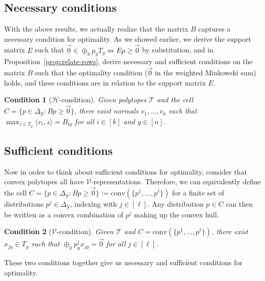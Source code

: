 \documentclass[12pt]{article}
\newcommand{\Comments}{1}
\newcommand{\mytodo}[2]{\ifnum\Comments=1%
  \todo[linecolor=#1!80!black,backgroundcolor=#1,bordercolor=#1!80!black]{#2}\fi}
\newcommand{\jessiet}[1]{\mytodo{purple!20!white}{JF: #1}}
\newcommand{\simplex}{\Delta_\Y}
\renewcommand{\H}{\mathcal{H}}
\newcommand{\T}{\mathcal{T}}
\newcommand{\V}{\mathcal{V}}
\newcommand{\Y}{\mathcal{Y}}
\newcommand{\inprod}[2]{\langle #1, #2 \rangle}%
\newcommand{\conv}{\mathrm{conv}}
\newtheorem{condition}{Condition}
\begin{document}
  \subsection{Necessary conditions}
    With the above results, we actually realize that the matrix $B$ captures a necessary condition for optimality.
    As we showed earlier, we derive the support matrix $E$ such that $\vec 0 \in \oplus_y p_y T_y \iff Ep \geq \vec 0$ by substitution, and in Proposition~\ref{prop:relate-rows}, derive necessary and sufficient conditions on the matrix $B$ such that the optimality condition ($\vec 0$ in the weighted Minkowski sum) holds, and these conditions are in relation to the support matrix $E$.
    
    \begin{condition}[$\H$-condition]\label{cond:H-condition}
    	Given polytopes $\T$ and the cell $C = \{p \in \simplex : Bp \geq \vec 0\}$, there exist normals $v_1, \ldots, v_k$ such that $\max_{z \in T_y} \inprod{v_i}{z} = B_{iy}$ for all $i \in [k]$ and $y \in [n]$.
    \end{condition}
  

  \subsection{Sufficient conditions}
    Now in order to think about sufficient conditions for optimality, consider that convex polytopes all have $\V$-representations.
    Therefore, we can equivalently define the cell $C = \{p \in \simplex : Bp \geq \vec 0\} := \conv(\{p^1, \ldots, p^\ell\})$ for a finite set of distributions $p^j \in \simplex$, indexing with $j \in [\ell]$.
    Any distribution $p \in C$ can then be written as a convex combination of $p^j$ making up the convex hull.
    \begin{condition}[$\V$-condition]\label{cond:V-condition}
    	Given $\T$ and $C = \conv(\{p^1, \ldots, p^\ell\})$, there exist $x_{jy} \in T_y$ such that $\oplus_y p^j_y x_{jy} = \vec 0$ for all $j \in [\ell]$.
    \end{condition}

  These two conditions together give us necessary and sufficient conditions for optimality.
  
\end{document}
